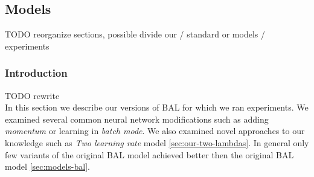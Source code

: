 \subsection{Models}
TODO reorganize sections, possible divide our / standard or models / experiments\\ 

\subsubsection*{Introduction} 
TODO rewrite  \\
In this section we describe our versions of BAL for which we ran experiments. We examined several common neural network modifications such as adding \emph{momentum} or learning in \emph{batch mode}. We also examined novel approaches to our knowledge such as \emph{Two learning rate} model \ref{sec:our-two-lambdas}. In general only few variants of the original BAL model achieved better then the original BAL model \ref{sec:models-bal}. 


 

 



 


